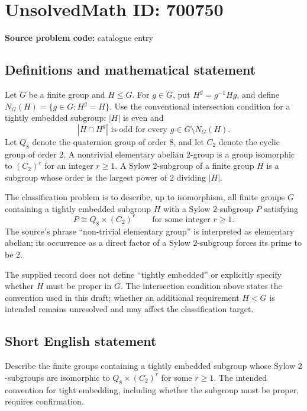 \documentclass[11pt]{article}
\begin{document}
\section*{UnsolvedMath ID: 700750}
\textbf{Source problem code:} catalogue entry
\subsection{Definitions and mathematical statement}
Let \(G\) be a finite group and \(H\leq G\). For \(g\in G\), put \(H^g=g^{-1}Hg\), and define \(N_G(H)=\{g\in G:H^g=H\}\). Use the conventional intersection condition for a tightly embedded subgroup: \(|H|\) is even and
\[
|H\cap H^g|\text{ is odd for every }g\in G\setminus N_G(H).
\]
Let \(Q_8\) denote the quaternion group of order \(8\), and let \(C_2\) denote the cyclic group of order \(2\). A nontrivial elementary abelian \(2\)-group is a group isomorphic to \((C_2)^r\) for an integer \(r\geq 1\). A Sylow \(2\)-subgroup of a finite group \(H\) is a subgroup whose order is the largest power of \(2\) dividing \(|H|\).

The classification problem is to describe, up to isomorphism, all finite groups \(G\) containing a tightly embedded subgroup \(H\) with a Sylow \(2\)-subgroup \(P\) satisfying
\[
P\cong Q_8\times (C_2)^r
\qquad\text{for some integer }r\geq 1.
\]
The source's phrase ``non-trivial elementary group'' is interpreted as elementary abelian; its occurrence as a direct factor of a Sylow \(2\)-subgroup forces its prime to be \(2\).

The supplied record does not define ``tightly embedded'' or explicitly specify whether \(H\) must be proper in \(G\). The intersection condition above states the convention used in this draft; whether an additional requirement \(H<G\) is intended remains unresolved and may affect the classification target.
\subsection{Short English statement}
Describe the finite groups containing a tightly embedded subgroup whose Sylow \(2\)-subgroups are isomorphic to \(Q_8\times(C_2)^r\) for some \(r\geq 1\). The intended convention for tight embedding, including whether the subgroup must be proper, requires confirmation.
\end{document}
